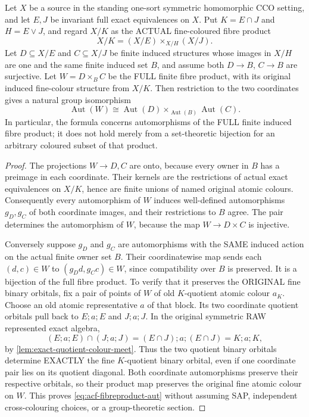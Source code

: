 \begin{lemma}
\label{lem:acf-fibreproduct-aut}
Let \(X\) be a source in the standing one-sort symmetric
homomorphic CCO setting, and let \(E,J\) be invariant full exact
equivalences on \(X\). Put
\(K=E\cap J\) and \(H=E\vee J\), and
regard \(X/K\) as the ACTUAL fine-coloured
fibre product
\[
       X/K=(X/E)\times_{X/H}(X/J).
\]
Let \(D\subseteq X/E\) and \(C\subseteq X/J\)
be finite induced structures whose images
in \(X/H\) are one and the same finite
induced set \(B\), and assume both
\(D\to B\), \(C\to B\) are surjective.
Let \(W=D\times_B C\) be the FULL finite
fibre product, with its original induced
fine-colour structure from \(X/K\).
Then restriction to the two coordinates
gives a natural group isomorphism
\[
 \boxed{\qquad
  \operatorname{Aut}(W)\cong
  \operatorname{Aut}(D)
       \times_{\operatorname{Aut}(B)}
  \operatorname{Aut}(C).\qquad}
\tag{FPA}\label{eq:acf-fibreproduct-aut}
\]
In particular, the formula concerns
automorphisms of the FULL finite induced
fibre product; it does not hold merely
from a set-theoretic bijection for an
arbitrary coloured subset of that product.
\end{lemma}
\begin{proof}
The projections \(W\to D,C\) are onto,
because every owner in \(B\) has a preimage
in each coordinate. Their kernels are
the restrictions of actual exact
equivalences on \(X/K\), hence are
finite unions of named original atomic
colours. Consequently every automorphism
of \(W\) induces well-defined
automorphisms \(g_D,g_C\) of both
coordinate images, and their restrictions
to \(B\) agree. The pair determines the
automorphism of \(W\), because the map
\(W\to D\times C\) is injective.

Conversely suppose \(g_D\) and \(g_C\)
are automorphisms with the SAME induced
action on the actual finite owner set
\(B\). Their coordinatewise map sends
each \((d,c)\in W\) to
\((g_Dd,g_Cc)\in W\), since compatibility
over \(B\) is preserved. It is a bijection
of the full fibre product. To verify
that it preserves the ORIGINAL fine
binary orbitals, fix a pair of points
of \(W\) of old \(K\)-quotient atomic
colour \(a_K\). Choose an old atomic
representative \(a\) of that block.
Its two coordinate quotient orbitals
pull back to \(E;a;E\) and \(J;a;J\).
In the original symmetric RAW represented
exact algebra,
\[
  (E;a;E)\cap(J;a;J)
     =(E\cap J);a;(E\cap J)
     =K;a;K ,
\]
by \cref{lem:exact-quotient-colour-meet}. Thus
the two quotient binary orbitals
determine EXACTLY the fine
\(K\)-quotient binary orbital, even
if one coordinate pair lies on its
quotient diagonal. Both coordinate
automorphisms preserve their
respective orbitals, so their
product map preserves the original
fine atomic colour on \(W\).
This proves \eqref{eq:acf-fibreproduct-aut}
without assuming SAP, independent
cross-colouring choices, or a
group-theoretic section.
\end{proof}

